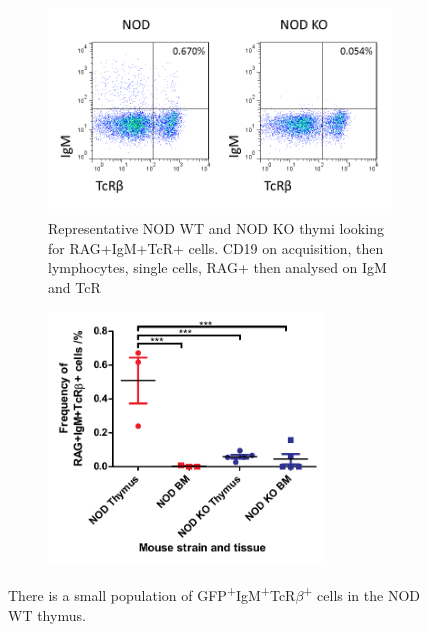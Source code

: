 \begin{figure}
	\begin{subfigure}{\textwidth}
	\includegraphics[width=\textwidth]{Figures/NODKOIgMTcR.png}
	\caption{Representative NOD WT and NOD KO thymi looking for RAG+IgM+TcR+ cells. CD19 on acquisition, then lymphocytes, single cells, RAG+ then analysed on IgM and TcR}
	\label{subfig:BMvThyRAGIgMTcR}
	\end{subfigure}
	\begin{subfigure}{\textwidth}
	\centering
	\includegraphics[width=0.8\textwidth]{Figures/IgMTcR.pdf}
	\caption{}
	\label{subfig:IgMTcRposgraph}
	\end{subfigure}
\caption[There is a very small population of IgM\textsuperscript{+}TcR$\beta$\textsuperscript{+} cells in the NOD thymus]{There is a small population of GFP\textsuperscript{+}IgM\textsuperscript{+}TcR$\beta$\textsuperscript{+} cells in the NOD WT thymus. 
}
\end{figure}
